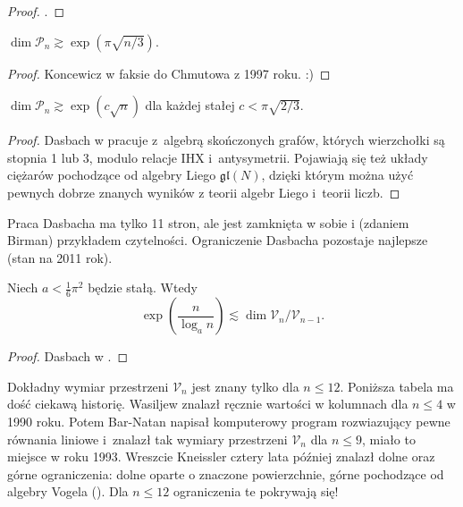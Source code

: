 \begin{proof}
    \cite{duzhin99}.
\end{proof}

\begin{proposition}
    $\dim \mathcal P_n \gtrsim \exp (\pi \sqrt{n/3})$.
\end{proposition}

\begin{proof}
    Koncewicz w faksie do Chmutowa z 1997 roku. :)
\end{proof}

\begin{proposition}
    $\dim \mathcal P_n \gtrsim \exp (c \sqrt{n})$ dla każdej stałej $c < \pi \sqrt{2/3}$.
\end{proposition}

\begin{proof}
%
    Dasbach w \cite{dasbach00} pracuje z~algebrą skończonych grafów, których wierzchołki są stopnia 1 lub 3, modulo relacje IHX i~antysymetrii.
    Pojawiają się też układy ciężarów pochodzące od algebry Liego $\mathfrak{gl}(N)$, dzięki którym można użyć pewnych dobrze znanych wyników z teorii algebr Liego i~teorii liczb.
\end{proof}

Praca Dasbacha ma tylko 11 stron, ale jest zamknięta w sobie i (zdaniem Birman) przykładem czytelności.
Ograniczenie Dasbacha pozostaje najlepsze (stan na 2011 rok).

\begin{corollary}
    Niech $a < \frac 1 6 \pi^2$ będzie stałą.
    Wtedy
    \begin{equation}
        \exp \left(\frac {n}{\log_a n} \right) \lesssim \dim \mathcal V_n / \mathcal V_{n-1}.
    \end{equation}
\end{corollary}

\begin{proof}
    Dasbach w \cite{dasbach00}.
\end{proof}

Dokładny wymiar przestrzeni $\mathcal V_n$ jest znany tylko dla $n \le 12$.
Poniższa tabela ma dość ciekawą historię.
Wasiljew znalazł ręcznie wartości w kolumnach dla $n \le 4$ w 1990 roku.
Potem Bar-Natan napisał komputerowy program rozwiazujący pewne równania liniowe i~znalazł tak wymiary przestrzeni $\mathcal V_n$ dla $n \le 9$, miało to miejsce w roku 1993.
Wreszcie Kneissler cztery lata później znalazł dolne oraz górne ograniczenia: dolne oparte o znaczone powierzchnie, górne pochodzące od algebry Vogela (\cite{kneissler97}).
%
Dla $n \le 12$ ograniczenia te pokrywają się!

